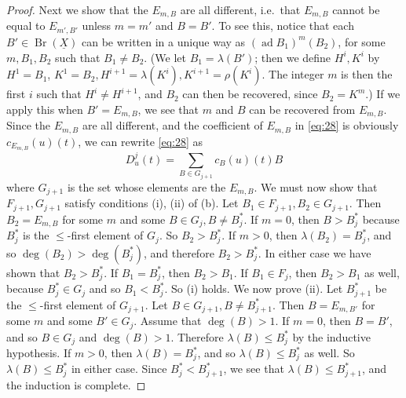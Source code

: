 \documentclass[leqno]{article}
\theoremstyle{plain}
\newcommand{\Br}{\operatorname{Br}(\underline{X})}
\begin{document}
\begin{proof}
	Next we show that the $E_{m, B}$ are all different, i.e.\ that $E_{m, B}$ cannot be equal to $E_{m',B'}$ unless $m=m'$ and $B=B'$. 
	To see this, notice that each $B'\in\Br$ can be written in a unique way as $\left(\operatorname{ad} B_{1}\right)^{m}\left(B_{2}\right)$, for some $m, B_{1}, B_{2}$ such that $B_{1} \neq B_{2}$. (We let $B_{1}=\lambda\left(B'\right)$; then we define $H^{i}, K^{i}$ by $H^{1}=B_{1}$, $K^{1}=B_{2}, H^{i+1}=\lambda\left(K^{i}\right), K^{i+1}=\rho\left(K^{i}\right)$. The integer $m$ is then the first $i$ such that $H^{i} \neq H^{i+1}$, and $B_{2}$ can then be recovered, since $B_{2}=K^{m}$.) If we apply this when $B'=E_{m, B}$, we see that $m$ and $B$ can be recovered from $E_{m, B}$. Since the $E_{m, B}$ are all different, and the coefficient of $E_{m, B}$ in \eqref{eq:28} is obviously $c_{E_{m, B}}(u)(t)$, we can rewrite \eqref{eq:28} as
	\begin{equation}
		D_{u}^{j}(t)=\sum_{B \in G_{j+1}} c_{B}(u)(t) B
	\end{equation}
	where $G_{j+1}$ is the set whose elements are the $E_{m, B}$.
	We must now show that $F_{j+1}, G_{j+1}$ satisfy conditions (i), (ii) of (b). 
	Let $B_{1} \in F_{j+1}, B_{2} \in G_{j+1}$. 
	Then $B_{2}=E_{m, B}$ for some $m$ and some $B \in G_{j}, B \neq B_{j}^{*}$. 
	If $m=0$, then $B>B_j^*$ because $B_{j}^{*}$ is the $\leq$-first element of $G_{j}$. 
	So $B_{2}>B_{j}^{*}$. 
	If $m>0$, then $\lambda\left(B_{2}\right)=B_{j}^{*}$, and so $\operatorname{deg}\left(B_{2}\right)>\operatorname{deg}\left(B_{j}^{*}\right)$, and therefore $B_{2}>B_{j}^{*}$. 
	In either case we have shown that $B_{2}>B_{j}^{*}$.
	If $B_{1}=B_{j}^{*}$, then $B_{2}>B_{1}$. 
	If $B_{1} \in F_{j}$, then $B_{2}>B_1$ as well, because $B_{j}^{*} \in G_{j}$ and so $B_{1}<B_{j}^{*}$. 
	So (i) holds. 
	We now prove (ii). 
	Let $B_{j+1}^{*}$ be the $\leq$-first element of $G_{j+1}$. 
	Let $B \in G_{j+1}, B \neq B_{j+1}^{*}$. 
	Then $B=E_{m, B'}$ for some $m$ and some $B' \in G_{j}$.
	Assume that $\operatorname{deg}(B)>1$. 
	If $m=0$, then $B=B'$, and so $B \in G_{j}$ and $\operatorname{deg}(B)>1$. Therefore $\lambda(B) \leq B_{j}^{*}$ by the inductive hypothesis. 
	If $m>0$, then $\lambda(B)=B_{j}^{*}$, and so $\lambda(B) \leq B_{j}^{*}$ as well. 
	So $\lambda(B) \leq B_{j}^{*}$ in either case. 
	Since $B_{j}^{*} < B_{j+1}^{*}$, we see that $\lambda(B) \leq B_{j+1}^{*}$, and the induction is complete.


\end{proof}
\end{document}
